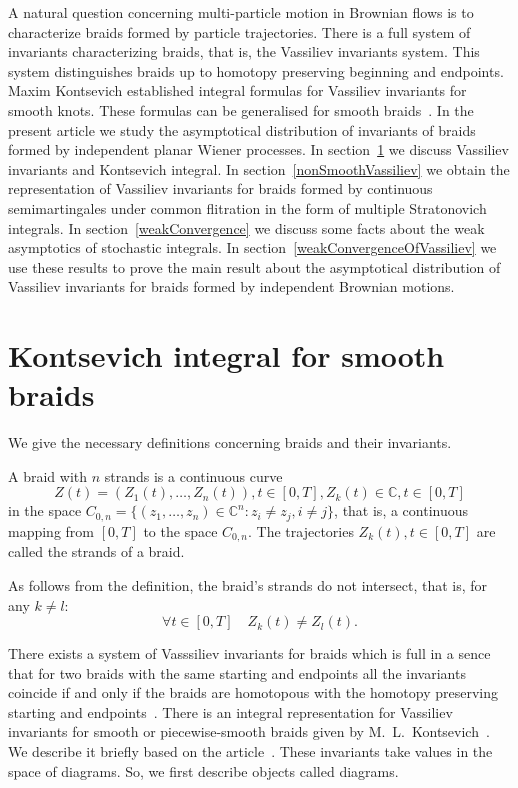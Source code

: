 \documentclass[12pt, a4paper, titlepage]{article}
\begin{document}
A natural question concerning multi-particle motion in Brownian flows is 
to characterize braids formed by particle trajectories. 
There is a full system of invariants characterizing braids, 
that is, the Vassiliev invariants system. 
This system distinguishes braids up to homotopy preserving beginning and endpoints.
Maxim Kontsevich established integral formulas for Vassiliev invariants
for smooth knots. These formulas can be generalised for smooth braids~\cite{Berger}. 
In the present article we study the asymptotical distribution of invariants of braids
formed by independent planar Wiener processes. 
In section~\ref{SmoothKontsevich} we discuss Vassiliev invariants and Kontsevich integral.
In section~\ref{nonSmoothVassiliev} we obtain the representation of Vassiliev
invariants for braids formed by continuous semimartingales under common flitration
in the form of multiple Stratonovich integrals. In section~\ref{weakConvergence}
we discuss some facts about the weak asymptotics of stochastic integrals.
In section~\ref{weakConvergenceOfVassiliev} we use these results to 
prove the main result about the asymptotical distribution of Vassiliev invariants
for braids formed by independent Brownian motions. 

\section{Kontsevich integral for smooth braids}\label{SmoothKontsevich}
We give the necessary definitions concerning braids and their  invariants.

\begin{definition}\cite{Berger}
 A braid with $n$ strands is a continuous curve
\begin{equation}\nonumber
Z(t)=(Z_1(t),\dots,Z_n(t)), t\in [0,T], Z_k(t)\in \mathbb{C}, t\in [0,T]
\end{equation}
in the space 
$C_{0,n}=\{(z_1,\ldots, z_n)\in\mathbb{C}^n:z_i\ne z_j, i\ne j\}$, that is,
a continuous mapping from $[0,T]$ to the space $C_{0,n}$.
The trajectories $Z_k(t), t\in [0,T]$ are called the strands of a braid.
\end{definition}
As follows from the definition, the braid's strands do not intersect, that is,
for any $k\ne l$: 
$$\forall t\in [0, T] \quad Z_k(t)\ne Z_l(t).$$

There exists a system of Vasssiliev invariants for braids
which is full in a sence that for two braids with the same starting and endpoints
all the invariants coincide if and only if the braids are homotopous
with the homotopy preserving starting and endpoints~\cite{BarNatan}. 
There is an integral representation for Vassiliev invariants
for smooth or piecewise-smooth braids
given by M.~L.~Kontsevich~\cite{Kontsevich}. 
We describe it briefly based on the article~\cite{Berger}. 
These invariants take values in the space of diagrams. 
So, we first describe objects called diagrams. 
\end{document}
